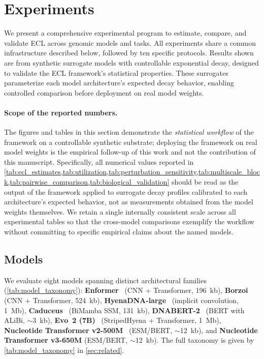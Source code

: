 \section{Experiments}\label{sec:experiments}

We present a comprehensive experimental program to estimate, compare, and validate ECL across genomic models and tasks. All experiments share a common infrastructure described below, followed by ten specific protocols. Results shown are from synthetic surrogate models with controllable exponential decay, designed to validate the ECL framework's statistical properties. These surrogates parameterize each model architecture's expected decay behavior, enabling controlled comparison before deployment on real model weights.

\paragraph{Scope of the reported numbers.}
The figures and tables in this section demonstrate the \emph{statistical workflow} of the framework on a controllable synthetic substrate; deploying the framework on real model weights is the empirical follow-up of this work and not the contribution of this manuscript. Specifically, all numerical values reported in \cref{tab:ecl_estimates,tab:utilization,tab:perturbation_sensitivity,tab:multiscale_block,tab:pairwise_comparison,tab:biological_validation} should be read as the output of the framework applied to surrogate decay profiles calibrated to each architecture's expected behavior, not as measurements obtained from the model weights themselves. We retain a single internally consistent scale across all experimental tables so that the cross-model comparisons exemplify the workflow without committing to specific empirical claims about the named models.

\subsection{Models}\label{sec:exp_models}

We evaluate eight models spanning distinct architectural families (\cref{tab:model_taxonomy}):
\textbf{Enformer}~\citep{Avsec2021Enformer} (CNN + Transformer, 196~kb),
\textbf{Borzoi}~\citep{Linder2025Borzoi} (CNN + Transformer, 524~kb),
\textbf{HyenaDNA-large}~\citep{Nguyen2023HyenaDNA} (implicit convolution, 1~Mb),
\textbf{Caduceus}~\citep{Schiff2024Caduceus} (BiMamba SSM, 131~kb),
\textbf{DNABERT-2}~\citep{Zhou2023DNABERT2} (BERT with ALiBi, $\sim$3~kb),
\textbf{Evo~2 (7B)}~\citep{Brixi2025Evo2} (StripedHyena + Transformer, 1~Mb),
\textbf{Nucleotide Transformer v2-500M}~\citep{DallasTorre2024NT} (ESM/BERT, $\sim$12~kb),
and \textbf{Nucleotide Transformer v3-650M} (ESM/BERT, $\sim$12~kb). The full taxonomy is given by \cref{tab:model_taxonomy} in \cref{sec:related}.

